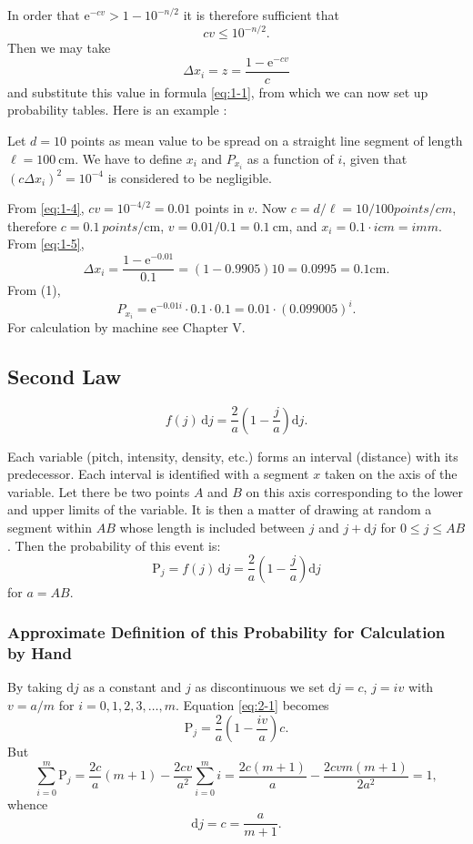 \documentclass[letterpaper, 11pt]{article}
\begin{document}
In order that \( \mathrm{e}^{-cv} > 1 - 10^{-n/2} \) it is therefore sufficient that
\[
    cv \leq 10^{-n/2}.
    \tag{4}
    \label{eq:1-4}
\]
Then we may take
\[
    \Delta x_i = z = \frac{1 - \mathrm{e}^{-cv}}{c}
    \tag{5}
    \label{eq:1-5}
\]
and substitute this value in formula \eqref{eq:1-1}, from which we can now set up probability tables.
Here is an example :

Let \( d = 10 \) points as mean value to be spread on a straight line segment
of length \( \ell = \qty{100}{\cm} \). We have to define \( x_i \) and \( P_{x_i} \) as a function of \( i \), given that \( \left( c \Delta x_i \right)^2 = 10^{-4} \) is considered to be negligible.

From \eqref{eq:1-4}, \( cv = 10^{-4/2} = 0.01 \) points in \( v \). Now \( c = d / \ell = 10 / 100 points/cm \), therefore \( c = \qty{0.1}{points/\cm} \), \( v = 0.01 / 0.1 = \qty{0.1}{\cm} \), and \( x_i = 0.1 \cdot i cm = i mm \).
From \eqref{eq:1-5},
\[\Delta x_i = \frac{1 - \mathrm{e}^{-0.01}}{0.1} = (1 - 0.9905) 10 = 0.0995 = 0.1 \text{cm}. \]
From (1),
\[P_{x_i} = \mathrm{e}^{-0.01i} \cdot 0.1 \cdot 0.1 = 0.01 \cdot (0.099005)^i .\]
For calculation by machine see Chapter V.


\subsection*{Second Law}

\[ f(j) \, \mathrm{d}j = \frac{2}{a} \left( 1 - \frac{j}{a} \right) \mathrm{d}j. \]

Each variable (pitch, intensity, density, etc.) forms an interval (distance) with its predecessor.
Each interval is identified with a segment \( x \) taken on the axis of the variable.
Let there be two points \( A \) and \( B \) on this axis corresponding to the lower and upper limits of the variable.
It is then a matter of drawing at random a segment within \( AB \) whose length is included between \( j \) and \( j + \mathrm{d} j \) for \( 0 \leq j \leq AB \).
Then the probability of this event is:
\[
    \mathrm{P}_j = f(j) \, \mathrm{d}j = \frac{2}{a} \left( 1 - \frac{j}{a} \right) \mathrm{d}j
    \tag{1}
    \label{eq:2-1}
\]
for \( a = AB \).


\subsubsection*{Approximate Definition of this Probability for Calculation by Hand}

By taking \( \mathrm{d}j \) as a constant and \( j \) as discontinuous we set \( \mathrm{d}j = c \), \( j = iv \) with \( v = a / m \) for \( i = 0, 1, 2, 3, \dots, m \).
Equation \eqref{eq:2-1} becomes
\[
     \mathrm{P}_j = \frac{2}{a} \left( 1 - \frac{iv}{a} \right) c.
    \tag{2}
    \label{eq:2-2}
\]
But
\[
    \sum_{i=0}^{m} \mathrm{P}_j = \frac{2c}{a} (m + 1) - \frac{2cv}{a^2} \sum_{i=0}^{m} i = \frac{2c (m+1)}{a} - \frac{2cvm (m+1)}{2a^2} = 1,
\]
whence
\[ \mathrm{d}j = c = \frac{a}{m + 1} .
\]
\end{document}
